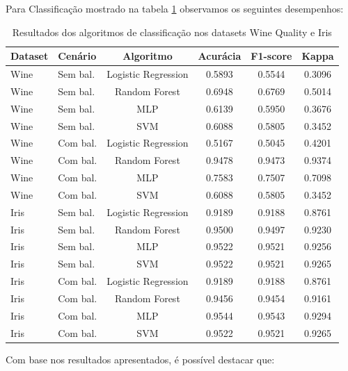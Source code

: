 Para Classificação mostrado na tabela \ref{tab:classificacao} observamos os seguintes desempenhos:

\begin{table}[ht]
    \centering
    \caption{Resultados dos algoritmos de classificação nos datasets Wine Quality e Iris}
    \label{tab:classificacao}
    \begin{tabular}{llcccc}
        \toprule
        \textbf{Dataset} & \textbf{Cenário} & \textbf{Algoritmo} & \textbf{Acurácia} & \textbf{F1-score} & \textbf{Kappa} \\
        \midrule
        Wine & Sem bal. & Logistic Regression & 0.5893 & 0.5544 & 0.3096 \\
        Wine & Sem bal. & Random Forest & 0.6948 & 0.6769 & 0.5014 \\
        Wine & Sem bal. & MLP & 0.6139 & 0.5950 & 0.3676 \\
        Wine & Sem bal. & SVM & 0.6088 & 0.5805 & 0.3452 \\
        Wine & Com bal. & Logistic Regression & 0.5167 & 0.5045 & 0.4201 \\
        Wine & Com bal. & Random Forest & 0.9478 & 0.9473 & 0.9374 \\
        Wine & Com bal. & MLP & 0.7583 & 0.7507 & 0.7098 \\
        Wine & Com bal. & SVM & 0.6088 & 0.5805 & 0.3452 \\
        Iris & Sem bal. & Logistic Regression & 0.9189 & 0.9188 & 0.8761 \\
        Iris & Sem bal. & Random Forest & 0.9500 & 0.9497 & 0.9230 \\
        Iris & Sem bal. & MLP & 0.9522 & 0.9521 & 0.9256 \\
        Iris & Sem bal. & SVM & 0.9522 & 0.9521 & 0.9265 \\
        Iris & Com bal. & Logistic Regression & 0.9189 & 0.9188 & 0.8761 \\
        Iris & Com bal. & Random Forest & 0.9456 & 0.9454 & 0.9161 \\
        Iris & Com bal. & MLP & 0.9544 & 0.9543 & 0.9294 \\
        Iris & Com bal. & SVM & 0.9522 & 0.9521 & 0.9265 \\
        \bottomrule
    \end{tabular}
\end{table}

Com base nos resultados apresentados, é possível destacar que:

